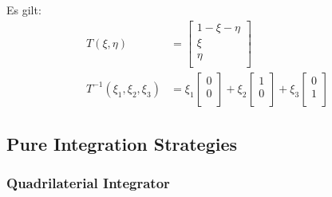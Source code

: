 \documentclass{mitschrift}
\begin{document}
Es gilt: \begin{align}
    T(\xi, \eta) &= \begin{bmatrix}
        1 - \xi - \eta \\
        \xi \\
        \eta \\
    \end{bmatrix} \\
    T^{-1}(\xi_1,\xi_2,\xi_3) &= \xi_1 \begin{bmatrix}
        0\\
        0\\
    \end{bmatrix} + \xi_2 \begin{bmatrix}
        1\\
        0\\
    \end{bmatrix} + \xi_3 \begin{bmatrix}
        0\\
        1\\
    \end{bmatrix}
\end{align}

\subsection{Pure Integration Strategies}

\subsubsection{Quadrilaterial Integrator}
\end{document}
